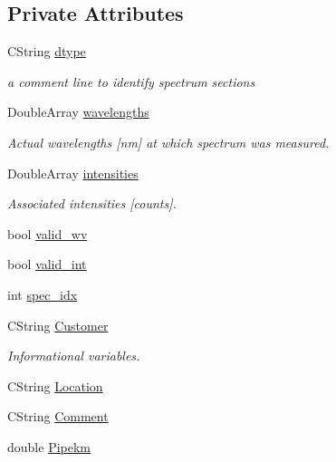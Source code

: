 \subsection*{Private Attributes}
\begin{DoxyCompactItemize}
\item 
CString \hyperlink{classCSpectrumData_a1b8b73035641724a1ba9b3f9d05c4299}{dtype}
\begin{DoxyCompactList}\small\item\em a comment line to identify spectrum sections \item\end{DoxyCompactList}\item 
DoubleArray \hyperlink{classCSpectrumData_a1cf704a000bea52aafa425caca920cf1}{wavelengths}
\begin{DoxyCompactList}\small\item\em Actual wavelengths \mbox{[}nm\mbox{]} at which spectrum was measured. \item\end{DoxyCompactList}\item 
DoubleArray \hyperlink{classCSpectrumData_af79aeb3250bbbe101327869ee9831b0f}{intensities}
\begin{DoxyCompactList}\small\item\em Associated intensities \mbox{[}counts\mbox{]}. \item\end{DoxyCompactList}\item 
bool \hyperlink{classCSpectrumData_ad09609599de7f2f14d8d78569dc2f1ab}{valid\_\-wv}
\item 
bool \hyperlink{classCSpectrumData_a5e59d31e303692c437fdb09937ef88ff}{valid\_\-int}
\item 
int \hyperlink{classCSpectrumData_a37f8129f4f3e277bccd5de6855eb6df7}{spec\_\-idx}
\item 
CString \hyperlink{classCSpectrumData_a18b8196a9ce67e89ba7a807b253ab003}{Customer}
\begin{DoxyCompactList}\small\item\em Informational variables. \item\end{DoxyCompactList}\item 
CString \hyperlink{classCSpectrumData_a95bb2c2be68e6e8a75777b10b984bfdb}{Location}
\item 
CString \hyperlink{classCSpectrumData_a23f7d316920cc4d7fbc84648be3e9c13}{Comment}
\item 
double \hyperlink{classCSpectrumData_af738611c087144f76f46d2f9adb98e38}{Pipekm}

\end{DoxyCompactItemize}
